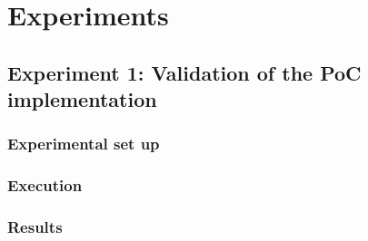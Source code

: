 \chapter{Experiments}\label{ch:Experiments}

\section{Experiment 1: Validation of the PoC implementation}
\subsection{Experimental set up}
\subsection{Execution}

\subsection{Results}
